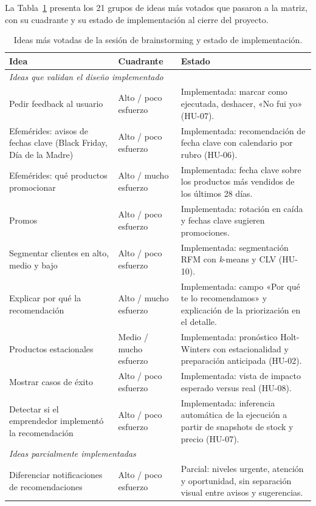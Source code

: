 La Tabla~\ref{tab:brainstorming-ideas} presenta los 21 grupos de ideas más votados que pasaron a la matriz, con su cuadrante y su estado de implementación al cierre del proyecto.

\begin{table}[ht]
\centering
\caption{Ideas más votadas de la sesión de brainstorming y estado de implementación.}
\label{tab:brainstorming-ideas}
\begin{tabular}{p{5.5cm} p{3cm} p{5.5cm}}
\hline
\textbf{Idea} & \textbf{Cuadrante} & \textbf{Estado} \\
\hline
\multicolumn{3}{l}{\textit{Ideas que validan el diseño implementado}} \\
\hline
Pedir feedback al usuario & Alto / poco esfuerzo & Implementada: marcar como ejecutada, deshacer, «No fui yo» (HU-07). \\
Efemérides: avisos de fechas clave (Black Friday, Día de la Madre) & Alto / poco esfuerzo & Implementada: recomendación de fecha clave con calendario por rubro (HU-06). \\
Efemérides: qué productos promocionar & Alto / mucho esfuerzo & Implementada: fecha clave sobre los productos más vendidos de los últimos 28 días. \\
Promos & Alto / poco esfuerzo & Implementada: rotación en caída y fechas clave sugieren promociones. \\
Segmentar clientes en alto, medio y bajo & Alto / poco esfuerzo & Implementada: segmentación RFM con \emph{k}-means y CLV (HU-10). \\
Explicar por qué la recomendación & Alto / mucho esfuerzo & Implementada: campo «Por qué te lo recomendamos» y explicación de la priorización en el detalle. \\
Productos estacionales & Medio / mucho esfuerzo & Implementada: pronóstico Holt-Winters con estacionalidad y preparación anticipada (HU-02). \\
Mostrar casos de éxito & Alto / poco esfuerzo & Implementada: vista de impacto esperado versus real (HU-08). \\
Detectar si el emprendedor implementó la recomendación & Alto / poco esfuerzo & Implementada: inferencia automática de la ejecución a partir de snapshots de stock y precio (HU-07). \\
\hline
\multicolumn{3}{l}{\textit{Ideas parcialmente implementadas}} \\
\hline
Diferenciar notificaciones de recomendaciones & Alto / poco esfuerzo & Parcial: niveles urgente, atención y oportunidad, sin separación visual entre avisos y sugerencias. \\

\end{tabular}
\end{table}
